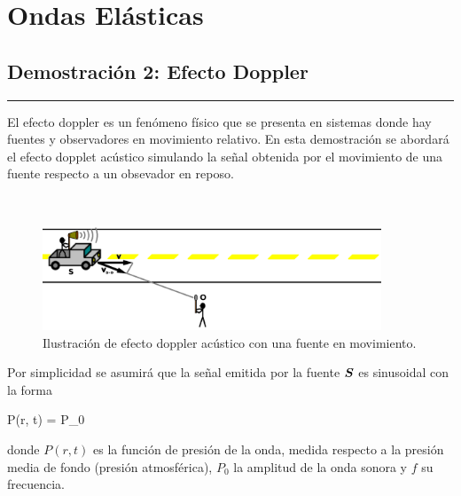 \chapter{Ondas Elásticas}
\label{cha:waves}





\section{Demostración 2: Efecto Doppler}
\label{sec:DEMO3_02}
\rule{14cm}{0.5mm}

El efecto doppler es un fenómeno físico que se presenta en sistemas donde
hay fuentes y observadores en movimiento relativo. En esta demostración se 
abordará el efecto dopplet acústico simulando la señal obtenida por el 
movimiento de una fuente respecto a un obsevador en reposo.

\
\begin{figure}[htbp]
	\centering
	\includegraphics[width=0.90\textwidth]
	{./pictures/doppler.png}

	\caption{\small{Ilustración de efecto doppler acústico con una 
	fuente en movimiento.}}
	
	\label{fig:doppler}
\end{figure}


Por simplicidad se asumirá que la señal emitida por la fuente $\boldsymbol{ S }$ es
sinusoidal con la forma

{P(r, t) = P_0\sin{}}

donde $P(r, t)$ es la función de presión de la onda, medida respecto a la 
presión media de fondo (presión atmosférica), $P_0$ la amplitud de la onda 
sonora y $f$ su frecuencia.

